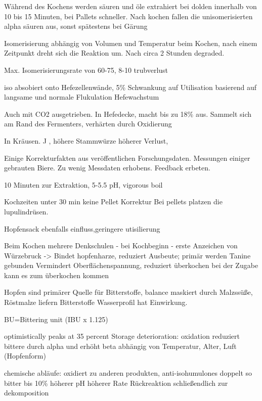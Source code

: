 \documentclass[a4paper,parskip=half]{scrartcl}
\begin{document}
\parencite[125]{Garetz1994} 
Während des Kochens werden säuren und öle extrahiert 
bei dolden innerhalb von 10 bis 15 Minuten, bei Pallets
schneller.
Nach kochen fallen die unisomerisierten alpha säuren
aus, sonst spätestens bei Gärung

Isomerisierung abhängig von Volumen und Temperatur beim
Kochen, nach einem Zeitpunkt dreht sich die Reaktion
um. Nach circa 2 Stunden degraded. 

\parencite[126]{Garetz1994} 
Max. Isomerisierungsrate von 60-75, 8-10 trubverlust

iso absobiert onto Hefezellenwände, 5\% Schwankung auf
Utilisation basierend auf langsame und normale Flukulation
Hefewachstum

Auch mit CO2 ausgetrieben. In Hefedecke, macht bis zu 18\%
aus. Sammelt sich am Rand des Fermenters, verhärten durch
Oxidierung

\parencite[133]{Garetz1994} 
In Kräusen. J , höhere Stammwürze höherer Verlust, 

\parencite[128]{Garetz1994} 
Einige Korrekturfakten aus veröffentlichen Forschungsdaten. 
Messungen einiger gebrauten Biere.
Zu wenig Messdaten erhobens. Feedback erbeten.

10 Minuten zur Extraktion, 5-5.5 pH, vigorous boil

\parencite[130]{Garetz1994} 
Kochzeiten unter 30 min keine Pellet Korrektur
Bei pellets platzen die lupulindrüsen. 

Hopfensack ebenfalls einfluss,geringere utisilierung

\parencite[153]{Garetz1994} 
Beim Kochen mehrere Denkschulen
- bei Kochbeginn
- erste Anzeichen von Würzebruck
-> Bindet hopfenharze, reduziert Ausbeute; primär werden
Tanine gebunden
Vermindert Oberflächenspannung, reduziert überkochen
bei der Zugabe kann es zum überkochen kommen

\parencite[158\psq]{Garetz1994} 
Hopfen sind primärer Quelle für Bitterstoffe, balance
maskiert durch Malzssüße, 
Röstmalze liefern Bitterstoffe
Wasserprofil hat Einwirkung.

BU=Bittering unit (IBU x 1.125)
\parencite[215]{Noonan1996}


\parencite[57]{Hall1997}
optimistically peaks at 35 percent
Storage deterioration: oxidation reduziert bittere durch alpha und erhöht beta
abhängig von Temperatur, Alter, Luft (Hopfenform)

chemische abläufe: oxidiert zu anderen produkten, 
anti-isohumulones doppelt so bitter bis 10\%
höherer pH höherer Rate
Rückreaktion schließendlich zur dekomposition
\end{document}
